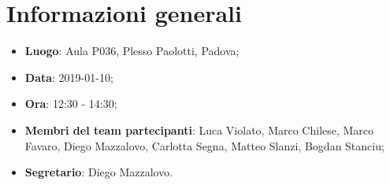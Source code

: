 \section{Informazioni generali}
\begin{itemize}
	\item \textbf{Luogo}: Aula P036, Plesso Paolotti, Padova; 
	\item \textbf{Data}: 2019-01-10; 
	\item \textbf{Ora}: 12:30 - 14:30; 
	\item \textbf{Membri del team partecipanti}: Luca Violato, Marco Chilese, Marco Favaro, Diego Mazzalovo, Carlotta Segna, Matteo Slanzi, Bogdan Stanciu; 
	\item \textbf{Segretario}: Diego Mazzalovo. 
\end{itemize}






